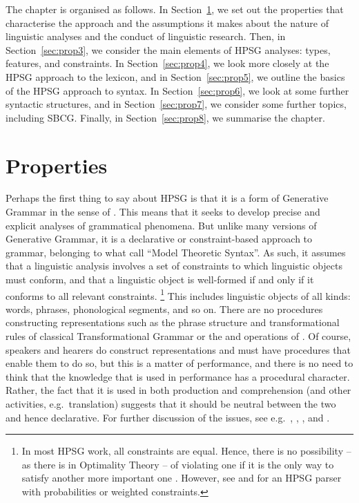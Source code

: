 \documentclass[output=paper,biblatex,babelshorthands,newtxmath,draftmode,colorlinks,citecolor=brown]{langscibook}
\begin{document}
The chapter is organised as follows. In Section~\ref{sec:prop2}, we set out the properties that
characterise the approach and the assumptions it makes about the nature of linguistic analyses and
the conduct of linguistic research. Then, in Section~\ref{sec:prop3}, we consider the main elements
of HPSG analyses: types, features, and constraints. In Section~\ref{sec:prop4}, we look more closely
at the HPSG approach to the lexicon, and in Section~\ref{sec:prop5}, we outline the basics of the
HPSG approach to syntax. In Section~\ref{sec:prop6}, we look at some further syntactic structures,
and in Section~\ref{sec:prop7}, we consider some further topics, including SBCG. Finally, in
Section~\ref{sec:prop8}, we summarise the chapter. 


\section{Properties}\label{sec:prop2}
\label{prop:sec-properties}

\largerpage[1.5]
Perhaps the first thing to say about HPSG is that it is a form of Generative Grammar in the sense of
\citet[]{Chomsky65a}. This means that it seeks to develop precise and explicit analyses of
grammatical phenomena. But unlike many versions of Generative Grammar, it is a declarative or
constraint-based approach to grammar, belonging to what \citet{PS2001a} call ``Model Theoretic
Syntax''. As such, it assumes that a linguistic analysis involves a set of constraints to which
linguistic objects must conform, and that a linguistic object is well-formed if and only if it
conforms to all relevant constraints.%
%
\footnote{In most HPSG work, all constraints are equal. Hence, there is no possibility -- as there
  is in Optimality Theory \citep{PS2004a-u} -- of violating one if it is the only way to satisfy another more
  important one \citep{Malouf2003a}. However, see  and  for an
  HPSG parser with probabilities or weighted constraints.} 
%
This includes linguistic objects of all kinds: words, phrases, phonological segments, and so
on. There are no procedures constructing representations such as the phrase structure and
transformational rules of classical Transformational Grammar or the  and  operations of
. Of course, speakers and hearers do construct representations and must have procedures
that enable them to do so, but this is a matter of performance, and there is no need to think that
the knowledge that is used in performance has a procedural character. Rather, the fact that it is
used in both production and comprehension (and other activities, e.g.\ translation) suggests that it
should be neutral between the two and hence declarative. For further discussion of the issues, see
e.g.\ \citet{PS2001a}, \citet{Postal2003a}, \citet{SW2011a,SW2015a}, and
. 
\end{document}

